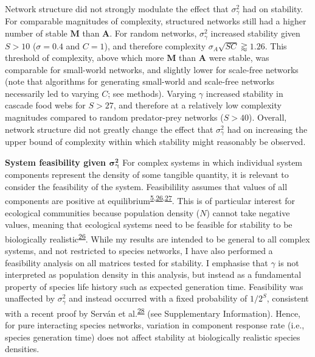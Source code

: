 \documentclass[]{article}
\begin{document}
Network structure did not strongly modulate the effect that
\(\sigma^{2}_{\gamma}\) had on stability. For comparable magnitudes of
complexity, structured networks still had a higher number of stable
\(\mathbf{M}\) than \(\mathbf{A}\). For random networks,
\(\sigma^{2}_{\gamma}\) increased stability given \(S > 10\)
(\(\sigma = 0.4\) and \(C = 1\)), and therefore complexity
\(\sigma_{A} \sqrt{SC} \gtrapprox 1.26\). This threshold of complexity,
above which more \(\mathbf{M}\) than \(\mathbf{A}\) were stable, was
comparable for small-world networks, and slightly lower for scale-free
networks (note that algorithms for generating small-world and scale-free
networks necessarily led to varying \(C\); see methods). Varying
\(\gamma\) increased stability in cascade food webs for \(S > 27\), and
therefore at a relatively low complexity magnitudes compared to random
predator-prey networks (\(S > 40\)). Overall, network structure did not
greatly change the effect that \(\sigma^{2}_{\gamma}\) had on increasing
the upper bound of complexity within which stability might reasonably be
observed.

\textbf{System feasibility given \(\mathbf{\sigma^{2}_{\gamma}}\)} For
complex systems in which individual system components represent the
density of some tangible quantity, it is relevant to consider the
feasibility of the system. Feasibilility assumes that values of all
components are positive at
equilibrium\textsuperscript{\protect\hyperlink{ref-Grilli2017}{5},\protect\hyperlink{ref-Dougoud2018}{26},\protect\hyperlink{ref-Song2018}{27}}.
This is of particular interest for ecological communities because
population density (\(N\)) cannot take negative values, meaning that
ecological systems need to be feasible for stability to be biologically
realistic\textsuperscript{\protect\hyperlink{ref-Dougoud2018}{26}}.
While my results are intended to be general to all complex systems, and
not restricted to species networks, I have also performed a feasibility
analysis on all matrices tested for stability. I emphasise that
\(\gamma\) is not interpreted as population density in this analysis,
but instead as a fundamental property of species life history such as
expected generation time. Feasibility was unaffected by
\(\sigma^{2}_{\gamma}\) and instead occurred with a fixed probability of
\(1/2^{S}\), consistent with a recent proof by Serván et
al.\textsuperscript{\protect\hyperlink{ref-Servan2018}{28}} (see
Supplementary Information). Hence, for pure interacting species
networks, variation in component response rate (i.e., species generation
time) does not affect stability at biologically realistic species
densities.
\end{document}
